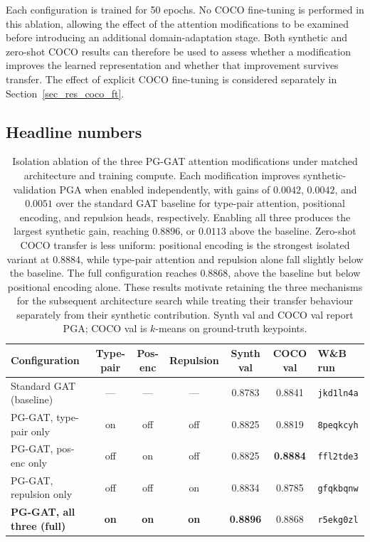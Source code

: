 Each configuration is trained for 50 epochs.
No COCO fine-tuning is performed in this ablation,
allowing the effect of the attention modifications to be examined
before introducing an additional domain-adaptation stage.
Both synthetic and zero-shot COCO results can therefore be used
to assess whether a modification improves the learned representation
and whether that improvement survives transfer.
The effect of explicit COCO fine-tuning is considered separately in
Section~\ref{sec_res_coco_ft}.

\subsection{Headline numbers}
\label{sec_res_pggat_ablations_numbers}

\begin{table}[H]
\centering
\caption[Isolation ablation of the three PG-GAT attention modifications under matched architecture and training compute.]{Isolation ablation of the three PG-GAT attention modifications
under matched architecture and training compute. Each modification
improves synthetic-validation PGA when enabled independently, with gains
of $0.0042$, $0.0042$, and $0.0051$ over the standard GAT baseline for
type-pair attention, positional encoding, and repulsion heads,
respectively. Enabling all three produces the largest synthetic gain,
reaching $0.8896$, or $0.0113$ above the baseline. Zero-shot COCO
transfer is less uniform: positional encoding is the strongest isolated
variant at $0.8884$, while type-pair attention and repulsion alone fall
slightly below the baseline. The full configuration reaches $0.8868$,
above the baseline but below positional encoding alone. These results
motivate retaining the three mechanisms for the subsequent architecture
search while treating their transfer behaviour separately from their
synthetic contribution.
Synth val and COCO val report PGA; COCO val is $k$-means on ground-truth keypoints.}
\label{tab:pggat_ablation_headline}
\tablesize
\setlength{\tabcolsep}{4pt}
\begin{tabular}{lcccccl}
\toprule
Configuration & Type-pair & Pos-enc & Repulsion & Synth val & COCO val & W\&B run \\
\midrule
Standard GAT (baseline)           & --- & --- & --- & 0.8783 & 0.8841 & \texttt{jkd1ln4a} \\
\midrule
PG-GAT, type-pair only            & on  & off & off & 0.8825 & 0.8819 & \texttt{8peqkcyh} \\
PG-GAT, pos-enc only              & off & on  & off & 0.8825 & \textbf{0.8884} & \texttt{ffl2tde3} \\
PG-GAT, repulsion only            & off & off & on  & 0.8834 & 0.8785 & \texttt{gfqkbqnw} \\
\textbf{PG-GAT, all three (full)} & \textbf{on} & \textbf{on} & \textbf{on}
                                  & \textbf{0.8896} & 0.8868 & \texttt{r5ekg0zl} \\
\bottomrule
\end{tabular}
\end{table}

